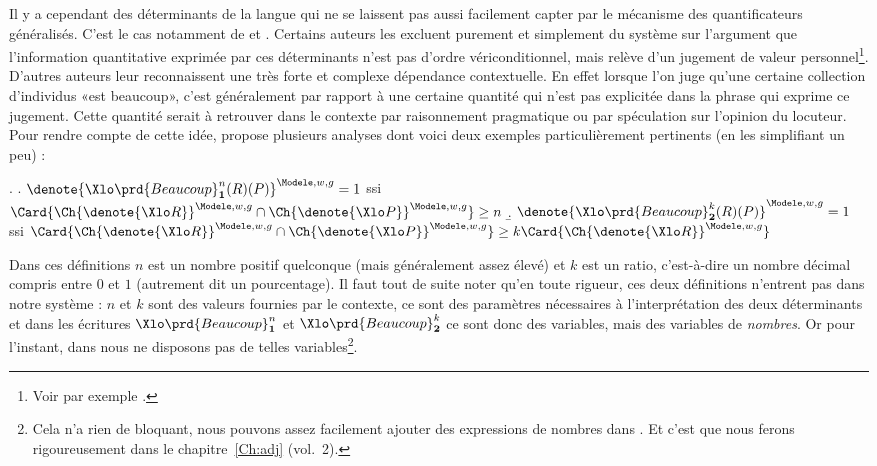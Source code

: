 Il y a cependant des déterminants de la langue qui ne se laissent pas aussi facilement capter par le mécanisme des quantificateurs généralisés.  C'est le cas notamment de  et .  Certains auteurs les excluent purement et simplement du système sur l'argument que l'information quantitative exprimée par ces déterminants n'est pas d'ordre vériconditionnel, mais relève d'un jugement de valeur personnel\footnote{Voir par exemple \citet[pp. 256--258]{KeenanStavi:86}.}.  D'autres auteurs leur reconnaissent une très forte et complexe dépendance contextuelle.
En effet lorsque l'on juge qu'une certaine collection d'individus «est beaucoup», c'est généralement par rapport à une certaine quantité qui n'est pas explicitée dans la phrase qui exprime ce jugement.  Cette quantité serait à retrouver dans le contexte par raisonnement pragmatique ou par spéculation sur l'opinion du locuteur.  Pour rendre compte de cette idée, \citet{Westerstahl:85}  propose plusieurs analyses dont voici deux exemples particulièrement pertinents (en les simplifiant un peu) :

\ex.
\a. \(\denote{\Xlo \prd{Beaucoup}_{\mathbf1}^n(R)(P)}^{\Modele,w,g}=1\) ssi
\(\Card{\Ch{\denote{\Xlo R}}^{\Modele,w,g} \cap \Ch{\denote{\Xlo P}}^{\Modele,w,g}} \geq n\)
\b. \(\denote{\Xlo \prd{Beaucoup}_{\mathbf2}^k(R)(P)}^{\Modele,w,g}=1\) ssi
\(\Card{\Ch{\denote{\Xlo R}}^{\Modele,w,g} \cap \Ch{\denote{\Xlo P}}^{\Modele,w,g}} \geq k \Card{\Ch{\denote{\Xlo R}}^{\Modele,w,g}}\)


Dans ces définitions $n$ est un nombre positif quelconque (mais généralement assez élevé) et $k$ est un ratio, c'est-à-dire un nombre décimal compris entre $0$ et $1$ (autrement dit un pourcentage).  Il faut tout de suite noter qu'en toute rigueur, ces deux définitions n'entrent pas dans notre système {\LO} : $n$ et $k$ sont des valeurs fournies par le contexte, ce sont des paramètres nécessaires à l'interprétation des deux déterminants et dans les écritures $\Xlo\prd{Beaucoup}_{\mathbf1}^n$ et $\Xlo\prd{Beaucoup}_{\mathbf2}^k$ ce sont donc des variables, mais des variables de \emph{nombres}.  Or pour l'instant, dans {\LO} nous ne disposons pas de telles variables\footnote{Cela n'a rien de bloquant, nous pouvons assez facilement ajouter des expressions de nombres dans {\LO}. Et c'est que nous ferons rigoureusement dans le chapitre~\ref{Ch:adj} (vol.~2).}.

\sloppy

